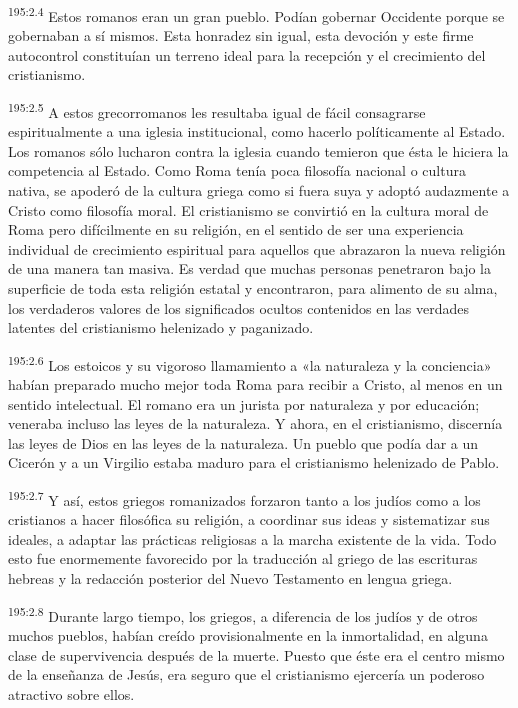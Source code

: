 \par
\textsuperscript{195:2.4} Estos romanos eran un gran pueblo. Podían gobernar Occidente porque se gobernaban a sí mismos. Esta honradez sin igual, esta devoción y este firme autocontrol constituían un terreno ideal para la recepción y el crecimiento del cristianismo.

\par
\textsuperscript{195:2.5} A estos grecorromanos les resultaba igual de fácil consagrarse espiritualmente a una iglesia institucional, como hacerlo políticamente al Estado. Los romanos sólo lucharon contra la iglesia cuando temieron que ésta le hiciera la competencia al Estado. Como Roma tenía poca filosofía nacional o cultura nativa, se apoderó de la cultura griega como si fuera suya y adoptó audazmente a Cristo como filosofía moral. El cristianismo se convirtió en la cultura moral de Roma pero difícilmente en su religión, en el sentido de ser una experiencia individual de crecimiento espiritual para aquellos que abrazaron la nueva religión de una manera tan masiva. Es verdad que muchas personas penetraron bajo la superficie de toda esta religión estatal y encontraron, para alimento de su alma, los verdaderos valores de los significados ocultos contenidos en las verdades latentes del cristianismo helenizado y paganizado.

\par
\textsuperscript{195:2.6} Los estoicos y su vigoroso llamamiento a «la naturaleza y la conciencia» habían preparado mucho mejor toda Roma para recibir a Cristo, al menos en un sentido intelectual. El romano era un jurista por naturaleza y por educación; veneraba incluso las leyes de la naturaleza. Y ahora, en el cristianismo, discernía las leyes de Dios en las leyes de la naturaleza. Un pueblo que podía dar a un Cicerón y a un Virgilio estaba maduro para el cristianismo helenizado de Pablo.

\par
\textsuperscript{195:2.7} Y así, estos griegos romanizados forzaron tanto a los judíos como a los cristianos a hacer filosófica su religión, a coordinar sus ideas y sistematizar sus ideales, a adaptar las prácticas religiosas a la marcha existente de la vida. Todo esto fue enormemente favorecido por la traducción al griego de las escrituras hebreas y la redacción posterior del Nuevo Testamento en lengua griega.

\par
\textsuperscript{195:2.8} Durante largo tiempo, los griegos, a diferencia de los judíos y de otros muchos pueblos, habían creído provisionalmente en la inmortalidad, en alguna clase de supervivencia después de la muerte. Puesto que éste era el centro mismo de la enseñanza de Jesús, era seguro que el cristianismo ejercería un poderoso atractivo sobre ellos.

